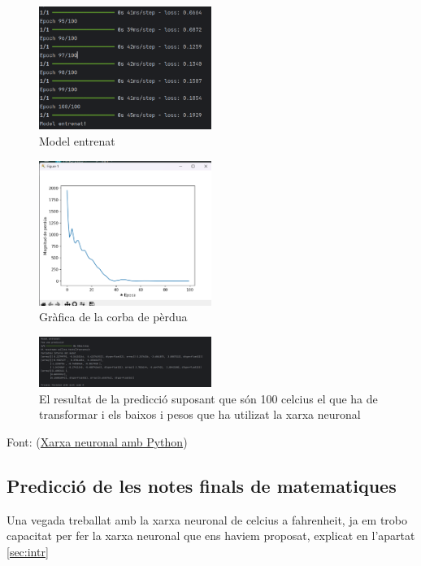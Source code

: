 \begin{figure}[H]
    \centering
    \includegraphics[width=0.5\textwidth]{./figures/11.png}
    \caption{Model entrenat}
\end{figure}


\begin{figure}[H]
    \centering
    \includegraphics[width=0.5\textwidth]{./figures/12.png}
    \caption{Gràfica de la corba de pèrdua}
\end{figure}


\begin{figure}[H]
    \centering
    \includegraphics[width=0.5\textwidth]{./figures/13.png}
    \caption{El resultat de la predicció suposant que són 100 celcius el que ha de transformar i els baixos i pesos que ha utilizat la xarxa neuronal}
\end{figure}


Font: (\href{https://www.youtube.com/watch?v=iX_on3VxZzkhttps://www.youtube.com/watch?v=iX_on3VxZzk}{Xarxa neuronal amb Python})

\subsection{Predicció de les notes finals de matematiques }
Una vegada treballat amb la xarxa neuronal de celcius a fahrenheit, ja em trobo capacitat per fer la xarxa neuronal que ens haviem proposat, explicat en l'apartat \ref{sec:intr}

